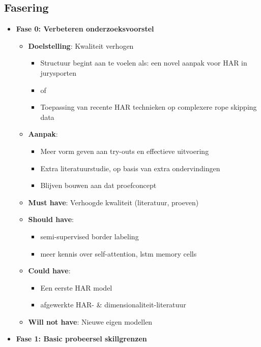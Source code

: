 \subsection{Fasering}

\begin{itemize}
    \item \textbf{Fase 0: Verbeteren onderzoeksvoorstel}
    \begin{itemize}
        \item \textbf{Doelstelling}: Kwaliteit verhogen
        \begin{itemize}
            \item Structuur begint aan te voelen als: een novel aanpak voor HAR in jurysporten
            \item of
            \item Toepassing van recente HAR technieken op complexere rope skipping data
        \end{itemize}
        \item \textbf{Aanpak}:
        \begin{itemize}
            \item Meer vorm geven aan try-outs en effectieve uitvoering
            \item Extra literatuurstudie, op basis van extra ondervindingen
            \item Blijven bouwen aan dat proefconcept
        \end{itemize}
        \item \textbf{Must have}: Verhoogde kwaliteit (literatuur, proeven)
        \item \textbf{Should have}:
        \begin{itemize}
            \item semi-supervised border labeling
            \item meer kennis over self-attention, lstm memory cells
        \end{itemize}
        \item \textbf{Could have}:
        \begin{itemize}
            \item Een eerste HAR model
            \item afgewerkte HAR- \& dimensionaliteit-literatuur
        \end{itemize}
        \item \textbf{Will not have}: Nieuwe eigen modellen
    \end{itemize}
    \item \textbf{Fase 1: Basic probeersel skillgrenzen}

\end{itemize}
